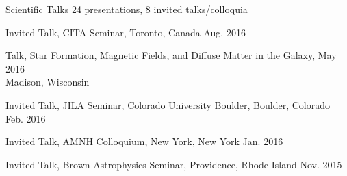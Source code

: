 \documentclass{resume_clark} %
\begin{document}
\begin{rSection}{Scientific Talks}
24 presentations, 8 invited talks/colloquia 
\begin{etaremune}




\item Invited Talk, CITA Seminar, Toronto, Canada \hfill {Aug. 2016}

\item Talk, Star Formation, Magnetic Fields, and Diffuse Matter in the Galaxy, \hfill{May 2016}\\
Madison, Wisconsin 

\item Invited Talk, JILA Seminar, Colorado University Boulder, Boulder, Colorado \hfill {Feb. 2016}

\item Invited Talk, AMNH Colloquium, New York, New York \hfill {Jan. 2016}

\item Invited Talk, Brown Astrophysics Seminar, Providence, Rhode Island \hfill {Nov. 2015}


\end{etaremune}
\end{rSection}
\end{document}
